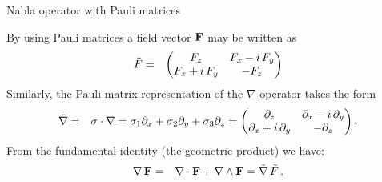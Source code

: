 \documentclass[handout,10pt]{beamer}
\begin{document}
\begin{frame}[fragile]{Nabla operator with Pauli matrices}

By using Pauli matrices a field vector $\mathbf{F}$ may be written as
%
\begin{eqnarray}
 \tilde{F}  & = &  \begin{pmatrix}{F}_{z} & {F}_{x}-i\,{F}_{y}\cr {F}_{x}+i\,{F}_{y} & -{F}_{z}\end{pmatrix}  
\end{eqnarray}
%
Similarly, \alert{the Pauli matrix representation of the $\nabla$ operator} takes the form
%
\begin{eqnarray}
\tilde{\nabla}  & = &  \sigma \cdot \nabla = \sigma_1 \partial_x + \sigma_2 \partial_y +\sigma_3 \partial_z =
 \begin{pmatrix}{\partial}_{z} & {\partial}_{x}-i\,{\partial}_{y}\cr {\partial}_{x}+i\,{\partial}_{y} & -{\partial}_{z}\end{pmatrix} .
\end{eqnarray}
%
From the fundamental identity (the geometric product) we have:
%
\begin{eqnarray}
 \nabla \, {\bf F}  & = &   \nabla \cdot \mathbf{F} + \nabla \wedge \mathbf{F} =  \tilde{\nabla} \,  \tilde{F}  \, .
 \label{Pauli_Identity}
\end{eqnarray}
%


\end{frame}
\end{document}
